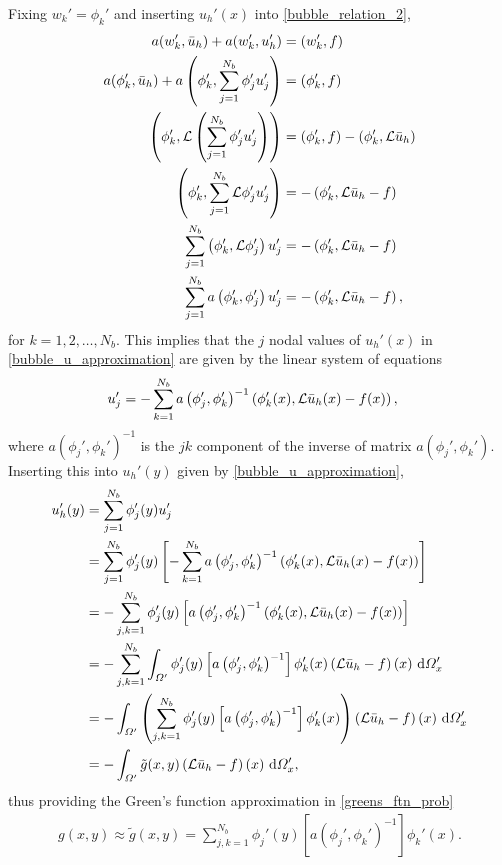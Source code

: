 Fixing $w_k' = \phi_k'$ and inserting $u_h'(x)$ into \cref{bubble_relation_2},
\begin{align*}
  a(w_k', \bar{u}_h) + a(w_k',u_h')  &= (w_k',f) \\
  a(\phi_k', \bar{u}_h) + a\left( \phi_k', \sum_{j=1}^{N_b} \phi_j' u_j' \right)  &= (\phi_k',f) \\
  \left( \phi_k', \mathcal{L} \left( \sum_{j=1}^{N_b} \phi_j' u_j' \right) \right)  &= (\phi_k',f) - (\phi_k', \mathcal{L} \bar{u}_h) \\
  \left( \phi_k', \sum_{j=1}^{N_b} \mathcal{L} \phi_j' u_j' \right)  &= - \left( \phi_k', \mathcal{L} \bar{u}_h - f \right) \\
  \sum_{j=1}^{N_b} \left( \phi_k', \mathcal{L} \phi_j' \right) u_j'  &= - \left( \phi_k', \mathcal{L} \bar{u}_h - f \right) \\
  \sum_{j=1}^{N_b} a\left( \phi_k', \phi_j' \right) u_j'  &= - \left( \phi_k', \mathcal{L} \bar{u}_h - f \right),
\end{align*}
for $k = 1,2,\ldots,N_b$.  This implies that the $j$ nodal values of $u_h'(x)$ in \cref{bubble_u_approximation} are given by the linear system of equations
\begin{align*}
  u_j' &= - \sum_{k=1}^{N_b} a\left( \phi_j', \phi_k' \right)^{-1} \left( \phi_k'(x), \mathcal{L} \bar{u}_h(x) - f(x) \right),
\end{align*}
where $a\left( \phi_j', \phi_k' \right)^{-1}$ is the $jk$ component of the inverse of matrix $a\left( \phi_j', \phi_k' \right)$.  Inserting this into $u_h'(y)$ given by \cref{bubble_u_approximation},
{\footnotesize
\begin{align*}
  u_h'(y) &= \sum_{j=1}^{N_b} \phi_j'(y) u_j' \\
  &= \sum_{j=1}^{N_b} \phi_j'(y) \left[ - \sum_{k=1}^{N_b} a\left( \phi_j', \phi_k' \right)^{-1} \left( \phi_k'(x), \mathcal{L} \bar{u}_h(x) - f(x) \right) \right] \\
  &= -\sum_{j,k=1}^{N_b} \phi_j'(y) \left[ a\left( \phi_j', \phi_k' \right)^{-1} \left( \phi_k'(x), \mathcal{L} \bar{u}_h(x) - f(x) \right) \right] \\
  &= - \sum_{j,k=1}^{N_b} \int_{\varOmega'} \phi_j'(y) \left[ a\left( \phi_j', \phi_k' \right)^{-1} \right] \phi_k'(x) \left(\mathcal{L} \bar{u}_h - f \right)(x) \ \mathrm{d}\varOmega_x' \\
  &= - \int_{\varOmega'} \left( \sum_{j,k=1}^{N_b} \phi_j'(y) \left[ a\left( \phi_j', \phi_k' \right)^{-1} \right] \phi_k'(x) \right) \left(\mathcal{L} \bar{u}_h - f \right)(x) \ \mathrm{d}\varOmega_x' \\
  &= - \int_{\varOmega'} \tilde{g}(x,y) \left(\mathcal{L} \bar{u}_h - f \right)(x) \ \mathrm{d}\varOmega_x',
\end{align*}}
thus providing the Green's function approximation in \cref{greens_ftn_prob}
\begin{align}
  \label{greens_ftn_approx}
  g(x,y) \approx \tilde{g}(x,y) = \sum_{j,k=1}^{N_b} \phi_j'(y) \left[ a\left( \phi_j', \phi_k' \right)^{-1} \right] \phi_k'(x).
\end{align}

